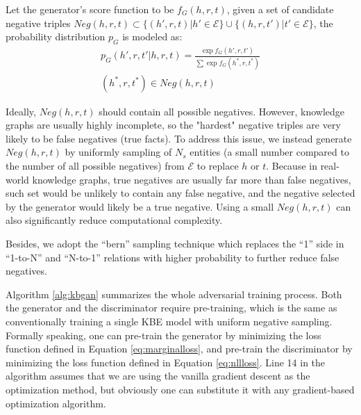 \documentclass[11pt,a4paper]{article}
\begin{document}
Let the generator's score function to be $f_G(h,r,t)$, given a set of candidate negative triples $Neg(h,r,t)\subset\{(h',r,t)|h'\in\mathcal{E}\}\cup\{(h,r,t')|t'\in\mathcal{E}\}$, the probability distribution $p_G$ is modeled as:
\begin{multline}
p_G(h',r,t'|h,r,t)=\frac{\exp f_G(h',r,t')}{\sum\exp f_G(h^*,r,t^*)} \\
(h^*,r,t^*)\in Neg(h,r,t)
\end{multline}

Ideally, $Neg(h,r,t)$ should contain all possible negatives. However, knowledge graphs are usually highly incomplete, so the "hardest" negative triples are very likely to be false negatives (true facts). To address this issue, we instead generate $Neg(h,r,t)$ by uniformly sampling of $N_s$ entities (a small number compared to the number of all possible negatives) from $\mathcal{E}$ to replace $h$ or $t$. Because in real-world knowledge graphs, true negatives are usually far more than false negatives, such set would be unlikely to contain any false negative, and the negative selected by the generator would likely be a true negative. Using a small $Neg(h,r,t)$ can also significantly reduce computational complexity.

Besides, we adopt the ``bern'' sampling technique \cite{wang2014knowledge} which replaces the ``1'' side in ``1-to-N'' and ``N-to-1'' relations with higher probability to further reduce false negatives.

Algorithm \ref{alg:kbgan} summarizes the whole adversarial training process. Both the generator and the discriminator require pre-training, which is the same as conventionally training a single KBE model with uniform negative sampling. Formally speaking, one can pre-train the generator by minimizing the loss function defined in Equation \eqref{eq:marginalloss}, and pre-train the discriminator by minimizing the loss function defined in Equation \eqref{eq:nllloss}. Line 14 in the algorithm assumes that we are using the vanilla gradient descent as the optimization method, but obviously one can substitute it with any gradient-based optimization algorithm.
\end{document}
